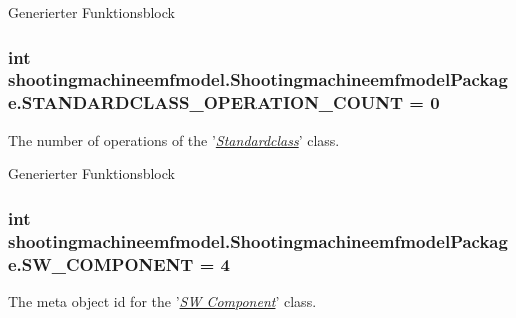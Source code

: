Generierter Funktionsblock  \hypertarget{interfaceshootingmachineemfmodel_1_1_shootingmachineemfmodel_package_a2fe5d848cfe0a02fe5609e2c5ed7e7c7}{
\subsubsection[{S\-T\-A\-N\-D\-A\-R\-D\-C\-L\-A\-S\-S\-\_\-\-O\-P\-E\-R\-A\-T\-I\-O\-N\-\_\-\-C\-O\-U\-N\-T}]{\setlength{\rightskip}{0pt plus 5cm}int shootingmachineemfmodel.\-Shootingmachineemfmodel\-Package.\-S\-T\-A\-N\-D\-A\-R\-D\-C\-L\-A\-S\-S\-\_\-\-O\-P\-E\-R\-A\-T\-I\-O\-N\-\_\-\-C\-O\-U\-N\-T = 0}}\label{interfaceshootingmachineemfmodel_1_1_shootingmachineemfmodel_package_a2fe5d848cfe0a02fe5609e2c5ed7e7c7}
The number of operations of the '{\itshape \hyperlink{interfaceshootingmachineemfmodel_1_1_standardclass}{Standardclass}}' class.

Generierter Funktionsblock  \hypertarget{interfaceshootingmachineemfmodel_1_1_shootingmachineemfmodel_package_ab7ed8841e91d706d808f950aa3a7d367}{
\subsubsection[{S\-W\-\_\-\-C\-O\-M\-P\-O\-N\-E\-N\-T}]{\setlength{\rightskip}{0pt plus 5cm}int shootingmachineemfmodel.\-Shootingmachineemfmodel\-Package.\-S\-W\-\_\-\-C\-O\-M\-P\-O\-N\-E\-N\-T = 4}}\label{interfaceshootingmachineemfmodel_1_1_shootingmachineemfmodel_package_ab7ed8841e91d706d808f950aa3a7d367}
The meta object id for the '\hyperlink{classshootingmachineemfmodel_1_1impl_1_1_s_w___component_impl}{{\itshape S\-W Component}}' class.

